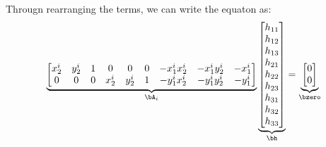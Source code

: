 \begin{problem}
\begin{answer}
      Througn rearranging the terms, we can write the equaton as:
      \begin{align*}
        \underbrace{\begin{bmatrix}
          x_2^i & y_2^i & 1 & 0 & 0 & 0 & -x_1^i x_2^i & -x_1^i y_2^i & -x_1^i \\
          0 & 0 & 0 & x_2^i & y_2^i & 1 & -y_1^i x_2^i & -y_1^i y_2^i & -y_1^i
        \end{bmatrix}}_{\bA_i}
        \underbrace{\begin{bmatrix}
          h_{11} \\ 
          h_{12} \\
          h_{13} \\
          h_{21} \\
          h_{22} \\
          h_{23} \\
          h_{31} \\
          h_{32} \\
          h_{33}
        \end{bmatrix}}_{\bh}
        = 
        \underbrace{\begin{bmatrix}
          0 \\
          0
        \end{bmatrix}}_{\bzero}
    \end{align*}
  \end{answer}
\end{problem}

